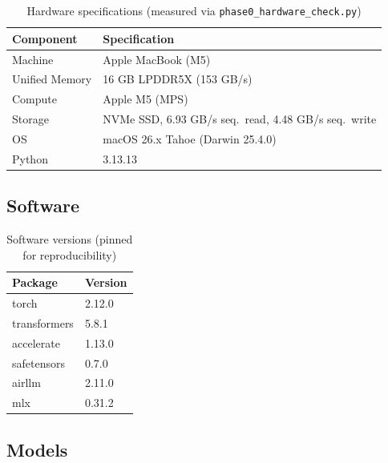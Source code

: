 \documentclass[10pt,a4paper]{article}
\begin{document}
\begin{table}[htbp]
\centering
\caption{Hardware specifications (measured via \texttt{phase0\_hardware\_check.py})}
\label{tab:hardware}
\begin{tabular}{@{}ll@{}}
\toprule
\textbf{Component} & \textbf{Specification} \\
\midrule
Machine & Apple MacBook (M5) \\
Unified Memory & 16 GB LPDDR5X (153 GB/s) \\
Compute & Apple M5 (MPS) \\
Storage & NVMe SSD, 6.93 GB/s seq.\ read, 4.48 GB/s seq.\ write \\
OS & macOS 26.x Tahoe (Darwin 25.4.0) \\
Python & 3.13.13 \\
\bottomrule
\end{tabular}
\end{table}

\subsection{Software}
\label{subsec:software}

\begin{table}[htbp]
\centering
\caption{Software versions (pinned for reproducibility)}
\label{tab:software}
\begin{tabular}{@{}ll@{}}
\toprule
\textbf{Package} & \textbf{Version} \\
\midrule
torch & 2.12.0 \\
transformers & 5.8.1 \\
accelerate & 1.13.0 \\
safetensors & 0.7.0 \\
airllm & 2.11.0 \\
mlx & 0.31.2 \\
\bottomrule
\end{tabular}
\end{table}

\subsection{Models}
\label{subsec:models}
\end{document}
